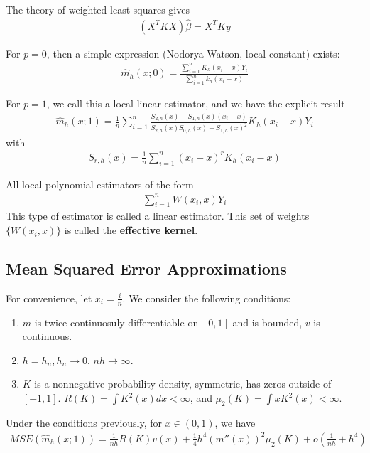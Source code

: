 The theory of weighted least squares gives
\begin{align}
  \label{eq:53}
  (X^{T} K X) \hat \beta = X^{T} K y
\end{align}

For $p = 0$, then a simple expression (Nodorya-Watson, local constant)
exists:
\begin{align}
  \label{eq:54}
  \hat m_{h}(x; 0) = \frac{\sum_{i=1}^{n} K_{h}(x_{i} -
    x)Y_{i}}{\sum_{i=1}^{n} k_{h}(x_{i} - x)}
\end{align}

For $p= 1$, we call this a local linear estimator, and we have the
explicit result
\begin{align}
  \label{eq:55}
  \hat m_{h}(x; 1) = \frac{1}{n} \sum_{i=1}^{n} \frac{S_{2, h}(x) -
    S_{1, h}(x)(x_{i} - x)}{S_{2, h}(x) S_{0, h}(x) - S_{1, h}(x)^{2}}
  K_{h}(x_{i} - x) Y_{i}
\end{align}
with
\begin{align}
  \label{eq:56}
  S_{r, h}(x) = \frac{1}{n} \sum_{i=1}^{n} (x_{i} - x)^{r} K_{h}(x_{i}
  - x)
\end{align}

All local polynomial estimators of the form
\begin{align}
  \label{eq:57}
  \sum_{i=1}^{n} W(x_{i}, x) Y_{i}
\end{align}
This type of estimator is called a linear estimator.   This set of
weights $\{ W(x_{i}, x) \}$ is called the \textbf{effective kernel}.

\subsection{Mean Squared Error Approximations}

For convenience, let $x_{i} = \frac{i}{n}$.  We consider the following
conditions:

\begin{enumerate}
\item $m$ is twice continuosuly differentiable on $[0, 1]$ and is bounded, $v$ is continuous.
\item $h = h_{n}, h_{n} \rightarrow 0$, $nh \rightarrow \infty$.
\item $K$ is a nonnegative probability density, symmetric, has zeros
  outside of $[-1, 1]$. $R(K) = \int K^{2}(x) dx < \infty$, and
  $\mu_{2}(K) = \int x K^{2}(x) < \infty$.
\end{enumerate}

\begin{thm}
  \label{defn:nonparametric_regression:1}
  Under the conditions previously, for $x \in (0, 1)$, we have
  \begin{align}
    \label{eq:58}
    MSE(\hat m_{h}(x; 1)) = \frac{1}{nh} R(K) v(x) + \frac{1}{4} h^{4}
    (m''(x))^{2} \mu_{2}(K) + o(\frac{1}{nh} + h^{4})
  \end{align}
\end{thm}

